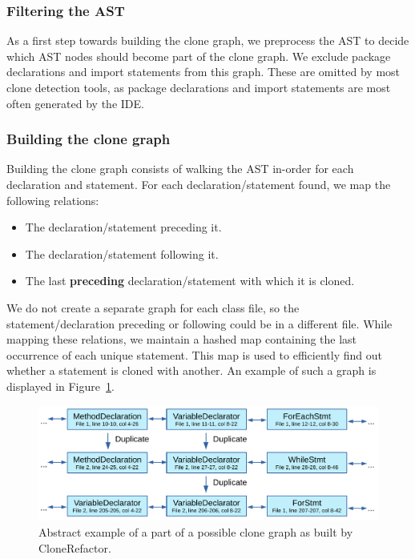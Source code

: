 \subsubsection{Filtering the AST}
As a first step towards building the clone graph, we preprocess the AST to decide which AST nodes should become part of the clone graph. We exclude package declarations and import statements from this graph. These are omitted by most clone detection tools, as package declarations and import statements are most often generated by the IDE.

\subsubsection{Building the clone graph}\label{sec:buildingclonegraph}
Building the clone graph consists of walking the AST in-order for each declaration and statement. For each declaration/statement found, we map the following relations:
\begin{itemize}
  \item The declaration/statement preceding it.
  \item The declaration/statement following it.
  \item The last \textbf{preceding} declaration/statement with which it is cloned.
\end{itemize}
We do not create a separate graph for each class file, so the statement/declaration preceding or following could be in a different file. While mapping these relations, we maintain a hashed map containing the last occurrence of each unique statement. This map is used to efficiently find out whether a statement is cloned with another. An example of such a graph is displayed in Figure~\ref{fig:clonegraphsimple}.

\begin{figure}[H]
  \centering
  \includegraphics[width=1\columnwidth]{img/CodeGraph2}
  \caption{Abstract example of a part of a possible clone graph as built by CloneRefactor.}
  \label{fig:clonegraphsimple}
\end{figure}

